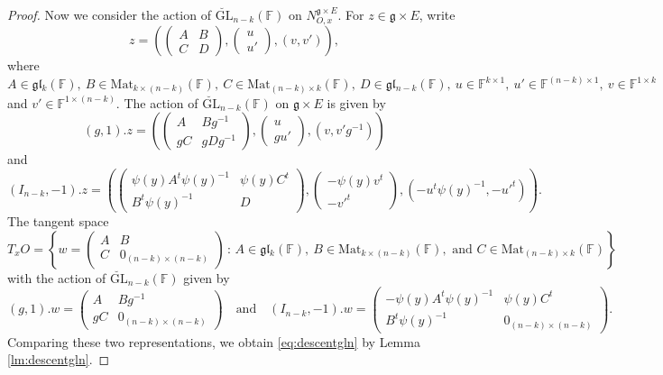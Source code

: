 \documentclass[10pt,a4paper]{amsart}
\newcommand{\B}{\mathbf{B}}
\newcommand{\C}{\mathbb{F}}
\newcommand{\GL}{{\mathrm{GL}}}
\newcommand{\Mat}{{\mathrm{Mat}}}
\newcommand{\g}{\mathfrak g}
\newcommand{\gC}{{\mathfrak g}_{\C}}
\newcommand{\gl}{\mathfrak g \mathfrak l}
\renewcommand{\mid}{\,:\,}
\renewcommand{\u}{\mathfrak u}
\begin{document}
\begin{proof}
    	Now we consider the action of $\breve{\GL}_{n-k}(\C)$ on $N_{O,x}^{\g\times E}$. For $z\in\g\times E$, write
    	\begin{equation*}
    		z=\left(\left(\begin{matrix}
    			A&B\\C&D
    		\end{matrix}\right),\left(\begin{matrix}
    		    u\\u'
    		\end{matrix}\right),(v,v')\right),
    	\end{equation*}
    	where $A\in\gl_k(\C),\ B\in\Mat_{k\times(n-k)}(\C),\ C\in\Mat_{(n-k)\times k}(\C),\ D\in\gl_{n-k}(\C),\ u\in\C^{k\times 1},\ u'\in\C^{(n-k)\times 1},\ v\in\C^{1\times k}$ and $v'\in\C^{1\times (n-k)}$. The action of $\breve{\GL}_{n-k}(\C)$ on $\g\times E$ is given by
    	\begin{equation*}
    		(g,1).z=\left(\left(\begin{matrix}
    			A&Bg^{-1}\\gC&gDg^{-1}
    		\end{matrix}\right),\left(\begin{matrix}
    			u\\gu'
    		\end{matrix}\right),(v,v'g^{-1})\right)
    	\end{equation*}
    	and
    	\begin{equation*}
    		(I_{n-k},-1).z=\left(\left(\begin{matrix}
    			\psi(y)A^t\psi(y)^{-1}&\psi(y)C^t\\B^t\psi(y)^{-1}&D
    		\end{matrix}\right),\left(\begin{matrix}
    			-\psi(y)v^t\\-v'^t
    		\end{matrix}\right),(-u^t\psi(y)^{-1},-u'^t)\right).
    	\end{equation*}
    	The tangent space
    	\begin{equation*}
    		T_xO=\left\{w=\left(\begin{matrix}
    			A&B\\C&0_{(n-k)\times(n-k)}
    		\end{matrix}\right)\mid A\in\gl_k(\C),\ B\in\Mat_{k\times(n-k)}(\C),\text{ and }C\in\Mat_{(n-k)\times k}(\C)\right\}
    	\end{equation*}
    	with the action of $\breve{\GL}_{n-k}(\C)$ given by
    	\begin{equation*}
    		(g,1).w=\left(\begin{matrix}
    			A&Bg^{-1}\\gC&0_{(n-k)\times(n-k)}
    		\end{matrix}\right)\quad\text{and}\quad(I_{n-k},-1).w=\left(\begin{matrix}
    		-\psi(y)A^t\psi(y)^{-1}&\psi(y)C^t\\B^t\psi(y)^{-1}&0_{(n-k)\times(n-k)}
    		\end{matrix}\right).
    	\end{equation*}
    	Comparing these two representations, we obtain \eqref{eq:descentgln} by Lemma \ref{lm:descentgln}.
    \end{proof}
\end{document}

